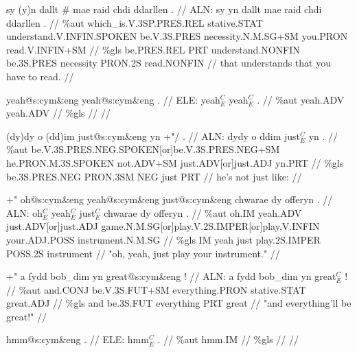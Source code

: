 \documentclass[a4paper,10pt]{article}
\begin{document}
\ex
\begingl[lingstyle=gergl]
\glchat sy (y)n dallt \# mae raid chdi ddarllen . //
\glsurface ALN:  sy yn dallt mae raid chdi ddarllen .  //
\glauto \%aut  which\_is{\scriptsize .V.3SP.PRES.REL} stative{\scriptsize .STAT} understand{\scriptsize .V.INFIN.SPOKEN} be{\scriptsize .V.3S.PRES} necessity{\scriptsize .N.M.SG+SM} you{\scriptsize .PRON} read{\scriptsize .V.INFIN+SM}   //
\glmanual \%gls  be{\scriptsize .PRES.REL} PRT understand{\scriptsize .NONFIN} be{\scriptsize .3S.PRES} necessity PRON{\scriptsize .2S} read{\scriptsize .NONFIN}   //
\gleng that understands that you have to read. //
\endgl
\xe

\ex
\begingl[lingstyle=gergl]
\glchat yeah@s:cym\&eng yeah@s:cym\&eng . //
\glsurface ELE:  yeah$^{C}_{E}$ yeah$^{C}_{E}$ .  //
\glauto \%aut  yeah{\scriptsize .ADV} yeah{\scriptsize .ADV}   //
\glmanual \%gls      //
\gleng  //
\endgl
\xe

\ex
\begingl[lingstyle=gergl]
\glchat (dy)dy o (dd)im just@s:cym\&eng yn +"/ . //
\glsurface ALN:  dydy o ddim just$^{C}_{E}$ yn .  //
\glauto \%aut  be{\scriptsize .V.3S.PRES.NEG.SPOKEN[or]be.V.3S.PRES.NEG+SM} he{\scriptsize .PRON.M.3S.SPOKEN} not{\scriptsize .ADV+SM} just{\scriptsize .ADV[or]just.ADJ} yn{\scriptsize .PRT}   //
\glmanual \%gls  be{\scriptsize .3S.PRES.NEG} PRON{\scriptsize .3SM} NEG just PRT   //
\gleng he's not just like: //
\endgl
\xe

\ex
\begingl[lingstyle=gergl]
\glchat +" oh@s:cym\&eng yeah@s:cym\&eng just@s:cym\&eng chwarae dy offeryn . //
\glsurface ALN:  oh$^{C}_{E}$ yeah$^{C}_{E}$ just$^{C}_{E}$ chwarae dy offeryn .  //
\glauto \%aut  oh{\scriptsize .IM} yeah{\scriptsize .ADV} just{\scriptsize .ADV[or]just.ADJ} game{\scriptsize .N.M.SG[or]play.V.2S.IMPER[or]play.V.INFIN} your{\scriptsize .ADJ.POSS} instrument{\scriptsize .N.M.SG}   //
\glmanual \%gls  IM yeah just play{\scriptsize .2S.IMPER} POSS{\scriptsize .2S} instrument   //
\gleng "oh, yeah, just play your instrument." //
\endgl
\xe

\ex
\begingl[lingstyle=gergl]
\glchat +" a fydd bob\_dim yn great@s:cym\&eng ! //
\glsurface ALN:  a fydd bob\_dim yn great$^{C}_{E}$ !  //
\glauto \%aut  and{\scriptsize .CONJ} be{\scriptsize .V.3S.FUT+SM} everything{\scriptsize .PRON} stative{\scriptsize .STAT} great{\scriptsize .ADJ}   //
\glmanual \%gls  and be{\scriptsize .3S.FUT} everything PRT great   //
\gleng "and everything'll be great!" //
\endgl
\xe

\ex
\begingl[lingstyle=gergl]
\glchat hmm@s:cym\&eng . //
\glsurface ELE:  hmm$^{C}_{E}$ .  //
\glauto \%aut  hmm{\scriptsize .IM}   //
\glmanual \%gls     //
\gleng  //
\endgl
\xe
\end{document}
